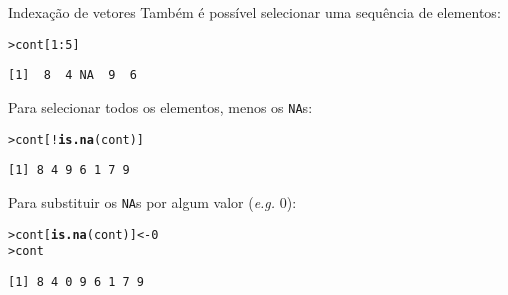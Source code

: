\documentclass[10pt,handout]{beamer}\usepackage{graphicx, color}
\makeatletter
\newcommand{\hlfunctioncall}[1]{\textcolor[rgb]{0,0,0.545098039215686}{\textbf{#1}}}%
\newenvironment{kframe}{%
 \def\at@end@of@kframe{}%
 \ifinner\ifhmode%
  \def\at@end@of@kframe{\end{minipage}}%
  \begin{minipage}{\columnwidth}%
 \fi\fi%
 \def\FrameCommand##1{\hskip\@totalleftmargin \hskip-\fboxsep
 \colorbox{shadecolor}{##1}\hskip-\fboxsep
     \hskip-\linewidth \hskip-\@totalleftmargin \hskip\columnwidth}%
 \MakeFramed {\advance\hsize-\width
   \@totalleftmargin\z@ \linewidth\hsize
   \@setminipage}}%
 {\par\unskip\endMakeFramed%
 \at@end@of@kframe}
\newenvironment{knitrout}{}{} %
\makeatother
\begin{document}
\begin{frame}[fragile=singleslide]{Indexação de vetores}
Também é possível selecionar uma sequência de elementos:
\begin{knitrout}\small
{}\color{fgcolor}\begin{kframe}
\begin{alltt}
> cont[1:5]
\end{alltt}
\begin{verbatim}
[1]  8  4 NA  9  6
\end{verbatim}
\end{kframe}
\end{knitrout}

Para selecionar todos os elementos, menos os \texttt{NA}s:
\begin{knitrout}\small
{}\color{fgcolor}\begin{kframe}
\begin{alltt}
> cont[!\hlfunctioncall{is.na}(cont)]
\end{alltt}
\begin{verbatim}
[1] 8 4 9 6 1 7 9
\end{verbatim}
\end{kframe}
\end{knitrout}

Para substituir os \texttt{NA}s por algum valor (\textit{e.g.} 0):
\begin{knitrout}\small
{}\color{fgcolor}\begin{kframe}
\begin{alltt}
> cont[\hlfunctioncall{is.na}(cont)] <- 0
> cont
\end{alltt}
\begin{verbatim}
[1] 8 4 0 9 6 1 7 9
\end{verbatim}
\end{kframe}
\end{knitrout}

\end{frame}
\end{document}
